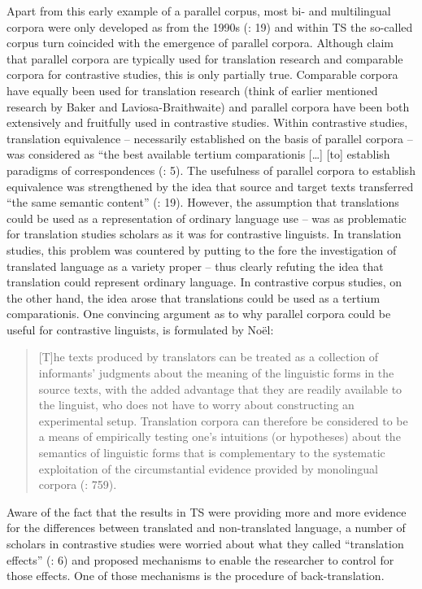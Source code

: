 Apart from this early example of a parallel corpus, most bi- and multilingual corpora were only developed as from the 1990s (\citealt{mcenery_corpus_2012}: 19) and within TS the so-called corpus turn coincided with the emergence of parallel corpora. Although \citet[20]{mcenery_corpus_2012} claim that parallel corpora are typically used for translation research and comparable corpora for contrastive studies, this is only partially true. Comparable corpora have equally been used for translation research (think of earlier mentioned research by Baker and Laviosa-Braithwaite) and parallel corpora have been both extensively and fruitfully used in contrastive studies. Within contrastive studies, translation equivalence – necessarily established on the basis of parallel corpora – was considered as “the best available tertium comparationis […] [to] establish paradigms of correspondences (\citealt{johansson_role_1998}: 5). The usefulness of parallel corpora to establish equivalence was strengthened by the idea that source and target texts transferred “the same semantic content” (\citealt{granger_corpus_2003}: 19). However, the assumption that translations could be used as a representation of ordinary language use – was as problematic for translation studies scholars as it was for contrastive linguists. In translation studies, this problem was countered by putting to the fore the investigation of translated language as a variety proper – thus clearly refuting the idea that translation could represent ordinary language. In contrastive corpus studies, on the other hand, the idea arose that translations could be used as a tertium comparationis. One convincing argument as to why parallel corpora could be useful for contrastive linguists, is formulated by Noël:


\begin{quote}
[T]he texts produced by translators can be treated as a collection of informants’ judgments about the meaning of the linguistic forms in the source texts, with the added advantage that they are readily available to the linguist, who does not have to worry about constructing an experimental setup. Translation corpora can therefore be considered to be a means of empirically testing one’s intuitions (or hypotheses) about the semantics of linguistic forms that is complementary to the systematic exploitation of the circumstantial evidence provided by monolingual corpora (\citealt{noel_translations_2003}: 759).
\end{quote}


Aware of the fact that the results in TS were providing more and more evidence for the differences between translated and non-translated language, a number of scholars in contrastive studies were worried about what they called “translation effects” (\citealt{johansson_role_1998}: 6) and proposed mechanisms to enable the researcher to control for those effects. One of those mechanisms is the procedure of back-translation.


